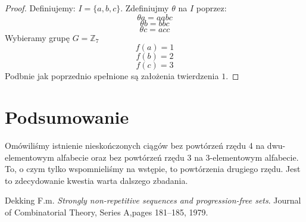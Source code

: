\documentclass[12pt,a4paper]{amsart}
\begin{document}
\begin{proof}
Definiujemy: $I = \{a, b, c\}$. Zdefiniujmy $\theta$ na $I$ poprzez:
\begin{equation}
\theta a = aabc
\end{equation}
\begin{equation}
\theta b = bbc
\end{equation}
\begin{equation}
\theta c = acc
\end{equation}
Wybieramy grupę $G = \mathbb{Z}_7$
\begin{equation}
f(a) = 1
\end{equation}
\begin{equation}
f(b) = 2
\end{equation}
\begin{equation}
f(c) = 3
\end{equation}
Podbnie jak poprzednio spełnione są założenia twierdzenia $1$.
\end{proof}

\section{Podsumowanie}
Omówiliśmy istnienie nieskończonych ciągów bez powtórzeń rzędu 4 na dwu-elementowym alfabecie oraz bez powtórzeń rzędu 3 na 3-elementowym alfabecie. To, o czym tylko wspomnieliśmy na wstępie, to powtórzenia drugiego rzędu. Jest to zdecydowanie kwestia warta dalszego zbadania.


\begin{thebibliography}{9}
Dekking F.m. 
\textit{Strongly non-repetitive sequences and progression-free sets}. 
Journal of Combinatorial Theory, Series A,pages 181–185, 1979.

\end{thebibliography}
\end{document}
